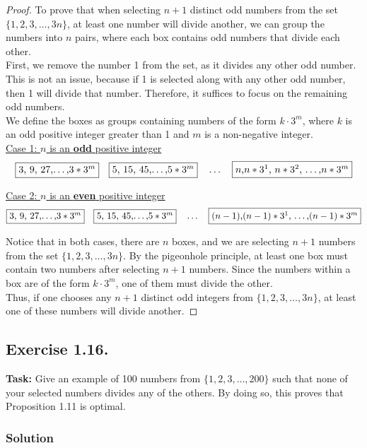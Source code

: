 \documentclass{article}
\begin{document}
\begin{proof}
 To prove that when selecting $n+1$ distinct odd numbers from the set $\{1, 2, 3, \ldots, 3n\}$, at least one number will divide another, we can group the numbers into $n$ pairs, where each box contains odd numbers that divide each other. \\
First, we remove the number 1 from the set, as it divides any other odd number. This is not an issue, because if 1 is selected along with any other odd number, then 1 will divide that number. Therefore, it suffices to focus on the remaining odd numbers. \\
We define the boxes as groups containing numbers of the form $k \cdot 3^m$, where $k$ is an odd positive integer greater than 1 and $m$ is a non-negative integer. \\
 

\underline{Case 1: $n$ is an \textbf{odd} positive integer}
    \[
    \fbox{3, 9, 27,\dots,$3*3^m$} \quad \fbox{5, 15, 45,\dots,$5*3^m$} \quad \dots \quad \fbox{$n$,$n*3^1$, $n*3^2$, \dots ,$n*3^m$}
    \]

\underline{Case 2: $n$ is an \textbf{even} positive integer}
    \[
    \fbox{3, 9, 27,\dots,$3*3^m$} \quad \fbox{5, 15, 45,\dots,$5*3^m$} \quad \dots \quad \fbox{$(n-1)$,$(n-1)*3^1$, \dots ,$(n-1)*3^m$}
    \] 

Notice that in both cases, there are $n$ boxes, and we are selecting $n+1$ numbers from the set $\{1, 2, 3, \ldots, 3n\}$. By the pigeonhole principle, at least one box must contain two numbers after selecting $n+1$ numbers. Since the numbers within a box are of the form $k \cdot 3^m$, one of them must divide the other. \\
Thus, if one chooses any $n+1$ distinct odd integers from $\{1, 2, 3, \ldots, 3n\}$, at least one of these numbers will divide another.
    
\end{proof}

\subsection{Exercise 1.16.} 
\textbf{Task:} Give an example of 100 numbers from $\{1, 2, 3, \ldots, 200\}$ such that none of your selected numbers divides any of the others. By doing so, this proves that Proposition 1.11 is optimal.

\subsubsection*{Solution}
\end{document}
